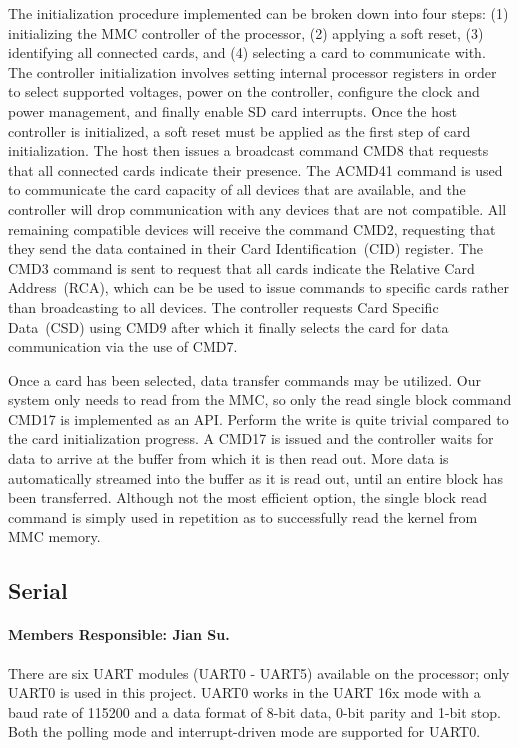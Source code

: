 \documentclass[12pt]{article}
\begin{document}
The initialization procedure implemented can be broken down into four steps: (1) initializing the MMC
controller of the processor, (2) applying a soft reset, (3) identifying all connected cards, and (4) selecting
a card to communicate with. The controller initialization involves setting internal processor registers in
order to select supported voltages, power on the controller, configure the clock and power management, and
finally enable SD card interrupts. Once the host controller is initialized, a soft reset must be applied as
the first step of card initialization. The host then issues a broadcast command CMD8 that requests that all
connected cards indicate their presence. The ACMD41 command is used to communicate the card capacity of all
devices that are available, and the controller will drop communication with any devices that are not
compatible. All remaining compatible devices will receive the command CMD2, requesting that they send the
data contained in their Card Identification~(CID) register. The CMD3 command is sent to request that
all cards indicate the Relative Card Address~(RCA), which can be be used to issue commands to specific cards
rather than broadcasting to all devices. The controller requests Card Specific Data~(CSD) using CMD9 after
which it finally selects the card for data communication via the use of CMD7.

Once a card has been selected, data transfer commands may be utilized. Our system only needs to read from the
MMC, so only the read single block command CMD17 is implemented as an API. Perform the write is quite trivial
compared to the card initialization progress. A CMD17 is issued and the controller waits for data to arrive
at the buffer from which it is then read out. More data is automatically streamed into the buffer as it is
read out, until an entire block has been transferred. Although not the most efficient option, the single block
read command is simply used in repetition as to successfully read the kernel from MMC memory.

\subsection{Serial}
\paragraph{Members Responsible: Jian Su.}

There are six UART modules (UART0 - UART5) available on the processor;
only UART0 is used in this project. UART0 works in the UART 16x mode with a
baud rate of 115200 and a data format of 8-bit data, 0-bit parity and 1-bit
stop. Both the polling mode and interrupt-driven mode are supported for UART0.
\end{document}
